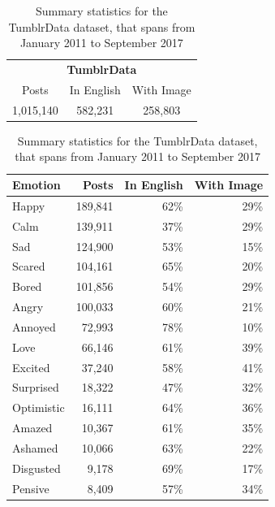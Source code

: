 \documentclass{article} %
\begin{document}
\begin{table}[H]
\caption{Summary statistics for the TumblrData dataset, that spans from January 2011 to September 2017}
\begin{center}
    \begin{tabular}{ccc}
    \multicolumn{3}{c}{{\large \textbf{TumblrData}}} \\
    \addlinespace[0.2cm]
    \toprule
    Posts & In English & With Image \\
    \midrule
    1,015,140 & 582,231 & 258,803 \\
    \bottomrule
    \end{tabular}
	
    \vspace{0.2cm}
    
    \begin{tabular}{lrrr}
    \toprule
    Emotion & Posts & In English & With Image\\
    \midrule
Happy & 189,841 & 62\% & 29\% \\
Calm & 139,911 & 37\% & 29\% \\
Sad & 124,900 & 53\% & 15\% \\
Scared & 104,161 & 65\% & 20\% \\
Bored & 101,856 & 54\% & 29\% \\
Angry & 100,033 & 60\% & 21\% \\
Annoyed & 72,993 & 78\% & 10\% \\
Love & 66,146 & 61\% & 39\% \\
Excited & 37,240 & 58\% & 41\% \\
Surprised & 18,322 & 47\% & 32\% \\
Optimistic & 16,111 & 64\% & 36\% \\
Amazed & 10,367 & 61\% & 35\% \\
Ashamed & 10,066 & 63\% & 22\% \\
Disgusted & 9,178 & 69\% & 17\% \\
Pensive & 8,409 & 57\% & 34\% \\
    \bottomrule
    \end{tabular}
    
    
\end{center}
\label{tumblrdata}
\end{table}
\end{document}
